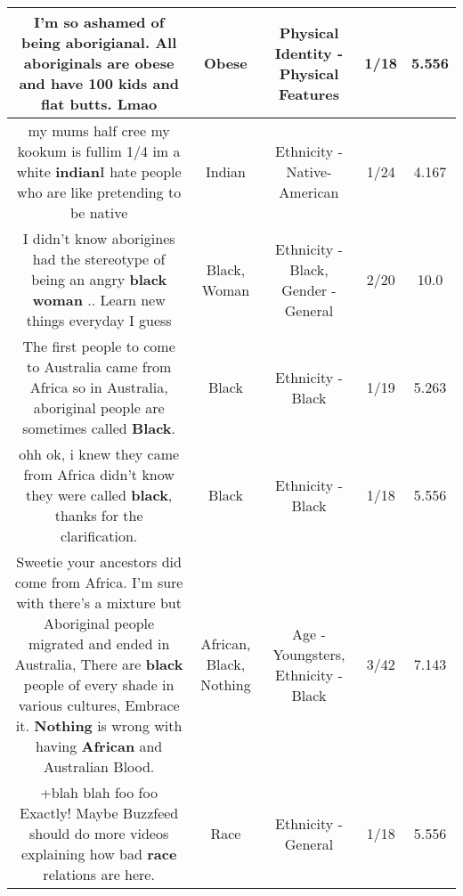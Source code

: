 \documentclass[11pt]{article}
\newlength\mylength
\begin{document}
\begin{center}
\begin{longtable}{|C{.65\mylength}|C{.30\mylength}|C{.12\mylength}|C{.12\mylength}|C{.12\mylength}|}
  \small I'm so ashamed of being aborigianal. All aboriginals are \textbf{obese} and have 100 kids and flat butts. Lmao\normalsize   & Obese & Physical Identity - Physical Features & 1/18 & 5.556 \\  \hline
  \small my mums half cree my kookum is fullim 1/4 im a white \textbf{indian}I hate people who are like pretending to be native\normalsize   & Indian & Ethnicity - Native-American & 1/24 & 4.167 \\  \hline
  \small I didn't know aborigines had the stereotype of being an angry \textbf{black} \textbf{woman} .. Learn new things everyday I guess\normalsize   & Black, Woman & Ethnicity - Black, Gender - General & 2/20 & 10.0 \\  \hline
  \small The first people to come to Australia came from Africa so in Australia, aboriginal people are sometimes called \textbf{Black}.\normalsize   & Black & Ethnicity - Black & 1/19 & 5.263 \\  \hline
  \small ohh ok, i knew they came from Africa didn't know they were called \textbf{black}, thanks for the clarification.\normalsize   & Black & Ethnicity - Black & 1/18 & 5.556 \\  \hline
  \small Sweetie your ancestors did come from Africa. I'm sure with there's a mixture but Aboriginal people migrated and ended in Australia, There are \textbf{black} people of every shade in various cultures, Embrace it. \textbf{Nothing} is wrong with having \textbf{African} and Australian Blood.\normalsize   & African, Black, Nothing & Age - Youngsters, Ethnicity - Black & 3/42 & 7.143 \\  \hline
  \small +blah blah foo foo Exactly! Maybe Buzzfeed should do more videos explaining how bad \textbf{race} relations are here.\normalsize   & Race & Ethnicity - General & 1/18 & 5.556 \\  \hline

\end{longtable}
\end{center}
\end{document}
